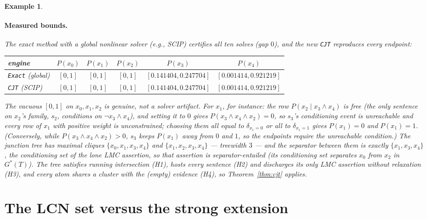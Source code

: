 \documentclass{article} %
\newtheorem{example}{Example}
\begin{document}
\begin{example}
\paragraph{Measured bounds.} The exact method with a global nonlinear solver (e.g., SCIP) certifies all
ten solves (gap $0$), and the new \texttt{CJT} reproduces every endpoint:
\begin{center}\small
\begin{tabular}{@{}lccccc@{}}
\toprule
engine & $P(x_0)$ & $P(x_1)$ & $P(x_2)$ & $P(x_3)$ & $P(x_4)$ \\
\midrule
\texttt{Exact} (global) & $[0,1]$ & $[0,1]$ & $[0,1]$ & $[0.141404,0.247704]$ & $[0.001414,0.921219]$ \\
\texttt{CJT} (SCIP)     & $[0,1]$ & $[0,1]$ & $[0,1]$ & $[0.141404,0.247704]$ & $[0.001414,0.921219]$ \\
\bottomrule
\end{tabular}
\end{center}
The vacuous $[0,1]$ on $x_0,x_1,x_2$ is genuine, not a solver artifact. For $x_1$, for instance:
the row $P(x_2\mid x_3\wedge x_4)$ is free (the only sentence on $x_2$'s family, $s_2$, conditions on
$\lnot x_3\wedge x_4$), and setting it to $0$ gives $P(x_3\wedge x_4\wedge x_2)=0$, so $s_3$'s
conditioning event is unreachable and every row of $x_1$ with positive weight is unconstrained;
choosing them all equal to $\delta_{x_1=0}$ or all to $\delta_{x_1=1}$ gives $P(x_1)=0$ and
$P(x_1)=1$. (Conversely, while $P(x_3\wedge x_4\wedge x_2)>0$, $s_3$ keeps $P(x_1)$ away from $0$ and
$1$, so the endpoints require the unreachable condition.)
The junction tree has maximal cliques $\{x_0,x_1,x_3,x_4\}$ and $\{x_1,x_2,x_3,x_4\}$ --- treewidth
$3$ --- and the separator between them is exactly $\{x_1,x_3,x_4\}$, the conditioning set of the lone
LMC assertion, so that assertion is separator-entailed (its conditioning set separates
$x_0$ from $x_2$ in $G^\ast(T)$). The tree satisfies running intersection (H1), hosts every sentence
(H2) and discharges its only LMC assertion without relaxation (H3), and every atom shares a cluster
with the (empty) evidence (H4), so Theorem~\ref{thm:cjt} applies.
\end{example}

\section{The LCN set versus the strong extension}
\label{sec:incl}
\end{document}

